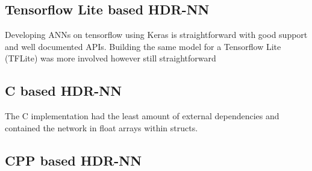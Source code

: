 \subsection[Tensorflow Lite]{Tensorflow Lite based HDR-NN}

Developing ANNs on tensorflow using Keras is straightforward with good support and well documented APIs. Building the same model for a Tensorflow Lite (TFLite) was more involved however still straightforward

\subsection[C]{C based HDR-NN}

The C implementation had the least amount of external dependencies and contained the network in float arrays within structs.

\subsection[CPP - Eigen]{CPP based HDR-NN}
